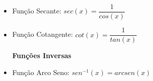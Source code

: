 \begin{itemize}
  \item Função Secante: $sec(x)= \dfrac{1}{cos (x)}$


  \item Função Cotangente: $cot(x)= \dfrac{1}{tan (x)}$


  \textbf{Funções Inversas}
  \item Função Arco Seno: $sen^{-1}(x)= arcsen (x)$



\end{itemize}
